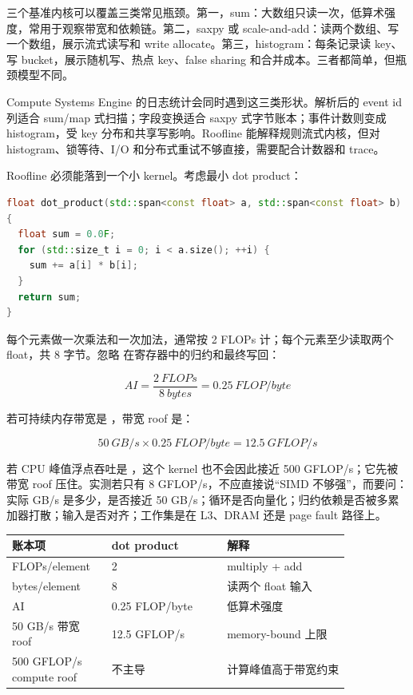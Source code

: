 三个基准内核可以覆盖三类常见瓶颈。第一，sum：大数组只读一次，低算术强度，常用于观察带宽和依赖链。第二，saxpy 或 scale-and-add：读两个数组、写一个数组，展示流式读写和 write allocate。第三，histogram：每条记录读 key、写 bucket，展示随机写、热点 key、false sharing 和合并成本。三者都简单，但瓶颈模型不同。

Compute Systems Engine 的日志统计会同时遇到这三类形状。解析后的 event id 列适合 sum/map 式扫描；字段变换适合 saxpy 式字节账本；事件计数则变成 histogram，受 key 分布和共享写影响。Roofline 能解释规则流式内核，但对 histogram、锁等待、I/O 和分布式重试不够直接，需要配合计数器和 trace。

Roofline 必须能落到一个小 kernel。考虑最小 dot product：

\begin{lstlisting}[language=C++,caption={dot product 的标量语义}]
float dot_product(std::span<const float> a, std::span<const float> b)
{
  float sum = 0.0F;
  for (std::size_t i = 0; i < a.size(); ++i) {
    sum += a[i] * b[i];
  }
  return sum;
}
\end{lstlisting}

每个元素做一次乘法和一次加法，通常按 2 FLOPs 计；每个元素至少读取两个 float，共 8 字节。忽略  在寄存器中的归约和最终写回：

\[
AI = \frac{2\ FLOPs}{8\ bytes} = 0.25\ FLOP/byte
\]

若可持续内存带宽是 ，带宽 roof 是：

\[
50\ GB/s \times 0.25\ FLOP/byte = 12.5\ GFLOP/s
\]

若 CPU 峰值浮点吞吐是 ，这个 kernel 也不会因此接近 500 GFLOP/s；它先被带宽 roof 压住。实测若只有 8 GFLOP/s，不应直接说“SIMD 不够强”，而要问：实际 GB/s 是多少，是否接近 50 GB/s；循环是否向量化；归约依赖是否被多累加器打散；输入是否对齐；工作集是在 L3、DRAM 还是 page fault 路径上。

\begin{center}
\begin{tabular}{p{0.22\linewidth}p{0.30\linewidth}p{0.32\linewidth}}
\toprule
账本项 & dot product & 解释 \\
\midrule
FLOPs/element & 2 & multiply + add \\
bytes/element & 8 & 读两个 float 输入 \\
AI & 0.25 FLOP/byte & 低算术强度 \\
50 GB/s 带宽 roof & 12.5 GFLOP/s & memory-bound 上限 \\
500 GFLOP/s compute roof & 不主导 & 计算峰值高于带宽约束 \\
\bottomrule
\end{tabular}
\end{center}

